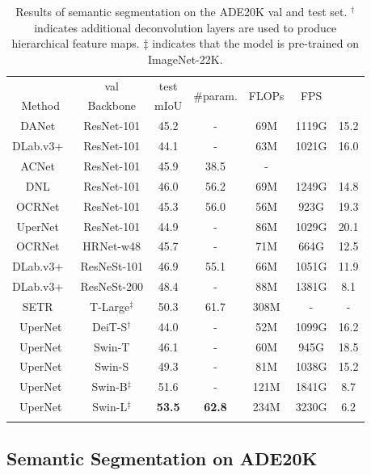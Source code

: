 \documentclass[10pt,twocolumn,letterpaper]{article}
\begin{document}
\begin{table}[t]
    \centering
    \small
\addtolength{\tabcolsep}{-4.1pt}
\begin{tabular}{cc|cc|ccc}
\Xhline{1.0pt}
\multicolumn{2}{c|}{ADE20K}& val & test & \multirow{2}{*}{\#param.} & \multirow{2}{*}{FLOPs} & \multirow{2}{*}{FPS} \\
Method & Backbone & mIoU & score &  &  &  \\
\hline
DANet~\cite{fu2019danet} & ResNet-101 & 45.2 & - & 69M & 1119G & 15.2 \\
DLab.v3+~\cite{chen2018dlabv3p} & ResNet-101 & 44.1 & - & 63M & 1021G & 16.0 \\
ACNet~\cite{fu2019acnet} & ResNet-101 & 45.9 & 38.5 & - & & \\
DNL~\cite{yin2020DNL} & ResNet-101 & 46.0 & 56.2 & 69M & 1249G & 14.8 \\
OCRNet~\cite{yuan2019ocr} & ResNet-101 & 45.3 & 56.0 & 56M & 923G & 19.3 \\
UperNet~\cite{xiao2018upernet} & ResNet-101 & 44.9 & - & 86M & 1029G & 20.1 \\
\hline
OCRNet~\cite{yuan2019ocr} & HRNet-w48 & 45.7 & - & 71M & 664G & 12.5 \\
DLab.v3+~\cite{chen2018dlabv3p} & ResNeSt-101 & 46.9 & 55.1 & 66M & 1051G & 11.9 \\
DLab.v3+~\cite{chen2018dlabv3p} & ResNeSt-200 & 48.4 & - & 88M & 1381G & 8.1 \\
SETR~\cite{zheng2020SETR} & T-Large$^\ddag$ & 50.3 & 61.7 & 308M & - & - \\
\hline
UperNet & DeiT-S$^\dag$ & 44.0 & - & 52M & 1099G & 16.2 \\
\hline
UperNet & Swin-T & 46.1 & - & 60M & 945G & 18.5 \\
UperNet & Swin-S & 49.3 & - & 81M & 1038G & 15.2 \\
UperNet & Swin-B$^\ddag$ & {51.6} & - & 121M & 1841G & 8.7 \\
UperNet & Swin-L$^\ddag$ & \textbf{53.5} & \textbf{62.8} & 234M & 3230G & 6.2 \\
\Xhline{1.0pt}
\end{tabular}
    \caption{Results of semantic segmentation on the ADE20K val and test set. $^\dag$ indicates additional deconvolution layers are used to produce hierarchical feature maps.  $\ddag$ indicates that the model is pre-trained on ImageNet-22K.}
    \label{tab:seg}
    \normalsize
\end{table}

\subsection{Semantic Segmentation on ADE20K}
\end{document}
